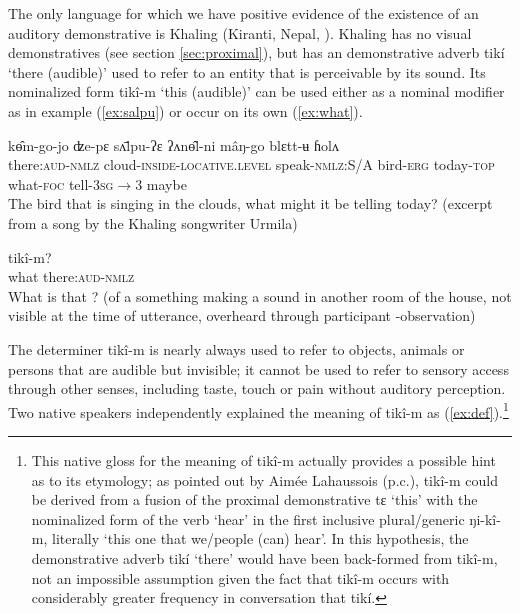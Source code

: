 \documentclass[oneside,a4paper,11pt]{article}
\newcommand{\ipa}[1]{{\phon \mbox{#1}}} %
\begin{document}
The only language for which we have positive evidence of the existence of an auditory demonstrative is Khaling (Kiranti, Nepal, \citealt{jacques14auditory}). Khaling has no visual demonstratives (see section \ref{sec:proximal}), but has an demonstrative adverb \ipa{tikí} `there (audible)' used to refer to an entity that is perceivable by its sound. Its nominalized form \ipa{tikî-m} `this (audible)' can be used either as a nominal modifier as in  example (\ref{ex:salpu}) or occur on its own (\ref{ex:what}). 

\begin{exe}
\ex \label{ex:salpu}
\gll    	 	\ipa{tikî-m}   	\ipa{kɵ̂m-go-jo}   	\ipa{ʣe-pɛ}   	\ipa{sʌ̄lpu-ʔɛ}   	\ipa{ʔʌnɵ̂l-ni}   	\ipa{mâŋ-go}   	\ipa{blɛtt-ʉ}   	\ipa{ɦolʌ}   
 \\
 there:\textsc{aud}-\textsc{nmlz} cloud-\textsc{inside-locative.level} speak-\textsc{nmlz:}S/A bird-\textsc{erg} today-\textsc{top} what-\textsc{foc} tell-\textsc{3sg$\rightarrow$3} maybe \\
\glt The bird that is singing in the clouds, what might it be telling today? (excerpt from a song by the Khaling songwriter Urmila)
\end{exe}

\begin{exe}
\ex \label{ex:what}
\gll  	\ipa{mâŋ}  	 	\ipa{tikî-m?}   \\
what  there:\textsc{aud}-\textsc{nmlz} \\
\glt What is that ? (of a something making a sound in another room of the house, not visible at the time of utterance, overheard through participant -observation)
\end{exe}

The determiner \ipa{tikî-m} is nearly always used to refer to objects, animals or persons  that are audible but invisible; it cannot be used to refer to sensory access through other senses, including taste, touch or pain without auditory perception. Two native speakers independently explained the meaning of  \ipa{tikî-m} as (\ref{ex:def}).\footnote{This native gloss for the meaning of \ipa{tikî-m} actually provides a possible hint as to its etymology; as pointed out by Aimée Lahaussois (p.c.), \ipa{tikî-m} could be derived from a fusion of the proximal demonstrative \ipa{tɛ} `this' with the nominalized form of the verb `hear' in the first inclusive plural/generic \ipa{ŋi-kî-m}, literally `this one that we/people (can) hear'. In this hypothesis, the demonstrative adverb \ipa{tikí} `there' would have been back-formed from \ipa{tikî-m}, not an impossible assumption given the fact that  \ipa{tikî-m} occurs with considerably greater frequency in conversation that  \ipa{tikí}. }
\end{document}
